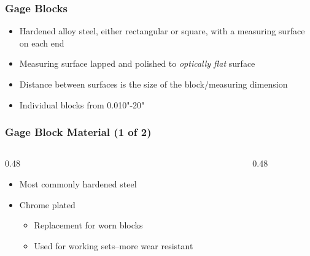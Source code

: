 \begin{frame}
	\frametitle{Gage Blocks}
    
    \begin{itemize}[<+- | alert@+>]
        \item Hardened alloy steel, either rectangular or square, with a measuring surface on each end
        \item Measuring surface lapped and polished to \emph{optically flat} surface
        \item Distance between surfaces is the size of the block/measuring dimension
        \item Individual blocks from 0.010"-20"
    \end{itemize}
\end{frame}

\begin{frame}
	\frametitle{Gage Block Material (1 of 2)}

    \begin{columns}
        \begin{column}{0.48\linewidth}
            \begin{itemize}[<+- | alert@+>]
                \item Most commonly hardened steel
                \item Chrome plated
                    \begin{itemize}
                        \item Replacement for worn blocks
                        \item Used for working sets--more wear resistant
                    \end{itemize}
            \end{itemize}
        \end{column}
        \begin{column}{0.48\linewidth}
        \end{column}
    \end{columns}
\end{frame}

